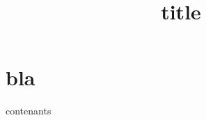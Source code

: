 \documentclass[11pt]{beamer}
\title{title}
\institute{institute}
\begin{document}
\section{bla}
\begin{frame}
contenants
\end{frame}
\end{document}

